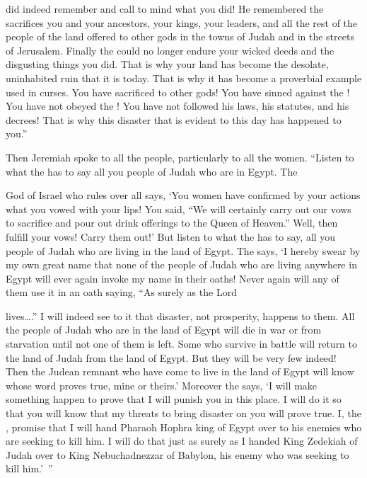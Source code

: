 {{}
did indeed remember
and call to mind
what you did! He remembered the sacrifices
you
and your ancestors,
your kings,
your leaders,
and all the rest of the people
of the land
offered
to other gods in the towns
of Judah
and in the streets
of Jerusalem.
Finally the
{}
could
no
longer
endure
your wicked
deeds
and the disgusting things
you did.
That
is why your land
has become the desolate,
uninhabited
ruin
that it is today.
That
is why it has become a proverbial example used in curses.
You have
sacrificed to other
gods! You have sinned
against the
{}! You have not
obeyed
the
{}! You have not
followed
his laws,
his statutes,
and his decrees! That is why
this disaster
that is evident
to this
day has happened to you.”
\par }{\PP {}Then Jeremiah
spoke to
all
the people,
particularly to
all
the women. “Listen
to what
the {}
has to say all
you people of Judah
who
are in Egypt.
The

{}
God
of Israel
who rules over all
says,
‘You
women
have confirmed
by your actions what
you vowed
with
your
lips! You said,
“We will certainly carry
out our vows
to sacrifice
and pour
out drink offerings
to the Queen
of Heaven.”
Well, then
fulfill
your vows! Carry them out!’
But
listen
to what
the {}
has to say, all
you people
of Judah
who are living in the land
of Egypt.
The
{}
says, ‘I
hereby swear
by my own great
name
that none
of the people of Judah
who are living
anywhere
in Egypt
will
ever again
invoke
my name
in their oaths! Never again will any of them use it in an oath saying,
“As surely
as the Lord

{} lives….”
I will indeed
see
to it that disaster,
not
prosperity,
happens to them. All
the people
of Judah
who
are in the land
of Egypt
will die
in war
or from starvation
until
not one of them is left.
Some who survive
in battle
will return
to the land
of Judah
from
the land
of Egypt.
But they will be very few
indeed! Then the Judean
remnant
who have come
to live
in the land
of Egypt
will know
whose
word
proves
true, mine or theirs.’
Moreover the
{}
says, ‘I will make something happen to prove that
I
will punish
you in
this
place.
I will do it so that
you will know
that
my threats
to bring
disaster on you will prove true.
I, the
{}, promise
that I will hand
Pharaoh Hophra
king
of Egypt
over
to his enemies
who are seeking
to kill
him. I will do that just
as surely as I handed
King
Zedekiah
of Judah
over
to King
Nebuchadnezzar
of Babylon,
his enemy
who was seeking
to kill him.’ ”

}
